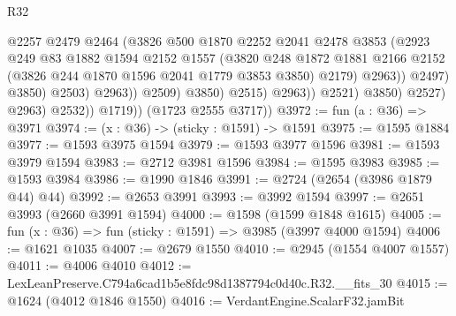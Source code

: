 \begin{lexlean}{R32}
\begin{coremodule}
                                          @2257
                                          @2479
                                          @2464
                                          (@3826
                                            @500
                                            @1870
                                            @2252
                                            @2041
                                            @2478
                                            @3853
                                            (@2923
                                              @249
                                              @83
                                              @1882
                                              @1594
                                              @2152
                                              @1557
                                              (@3820
                                                @248
                                                @1872
                                                @1881
                                                @2166
                                                @2152
                                                (@3826 @244 @1870 @1596 @2041 @1779 @3853 @3850)
                                                @2179)
                                              @2963))
                                          @2497)
                                        @3850)
                                      @2503)
                                    @2963))
                                @2509)
                              @3850)
                            @2515)
                          @2963))
                      @2521)
                    @3850)
                  @2527)
                @2963)
              @2532))
          @1719))
      (@1723 @2555 @3717))
@3972 := fun (a : @36) => @3971
@3974 := (x : @36) -> (sticky : @1591) -> @1591
@3975 := @1595 @1884
@3977 := @1593 @3975 @1594
@3979 := @1593 @3977 @1596
@3981 := @1593 @3979 @1594
@3983 := @2712 @3981 @1596
@3984 := @1595 @3983
@3985 := @1593 @3984
@3986 := @1990 @1846
@3991 := @2724 (@2654 (@3986 @1879 @44) @44)
@3992 := @2653 @3991
@3993 := @3992 @1594
@3997 := @2651 @3993 (@2660 @3991 @1594)
@4000 := @1598 (@1599 @1848 @1615)
@4005 := fun (x : @36) => fun (sticky : @1591) => @3985 (@3997 @4000 @1594)
@4006 := @1621 @1035
@4007 := @2679 @1550
@4010 := @2945 (@1554 @4007 @1557)
@4011 := @4006 @4010
@4012 := LexLeanPreserve.C794a6cad1b5e8fdc98d1387794c0d40c.R32.__fits_30
@4015 := @1624 (@4012 @1846 @1550)
@4016 := VerdantEngine.ScalarF32.jamBit

\end{coremodule}
\end{lexlean}
